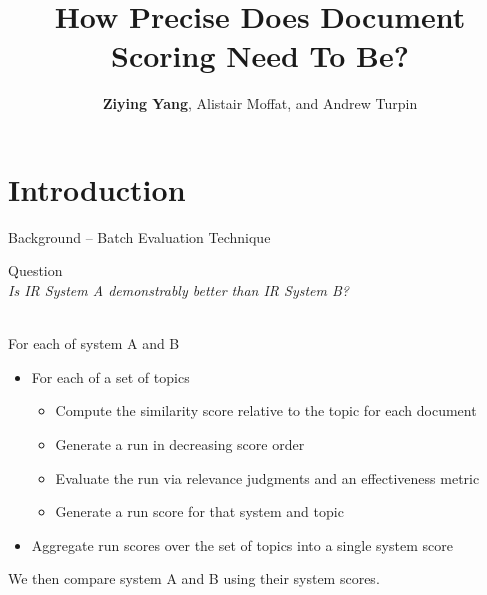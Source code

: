 \documentclass{beamer}
\title{How Precise Does Document Scoring Need To Be?}
\author{\textbf{Ziying Yang}, Alistair Moffat, and Andrew Turpin}
\institute[Universities of Melbourne] %
{
  \inst{}%
  University of Melbourne
}
\date{}
\begin{document}
\begin{frame}
  \titlepage
\end{frame}


\section{Introduction}
\begin{frame}{Background -- Batch Evaluation Technique}
\begin{block}{Question}
\\[0.3em]
\textit{Is IR System A demonstrably better than IR System B?}
\end{block}
\pause
\\[1em]
For each of system A and B\\[0.4em]
\begin{itemize}
  \item For each of a set of topics
  \begin{itemize}
    \item Compute the \alert{similarity score} relative to the topic for each document
    \item Generate a run in decreasing score order
    \item Evaluate the run via relevance judgments and an effectiveness metric
    \item Generate a \alert{run score} for that system and topic
  \end{itemize}
  \pause
  \item Aggregate run scores over the set of topics into a single \alert{system score}\\[1em] 
\end{itemize}

We then compare system A and B using their system scores.
\end{frame}
\end{document}
